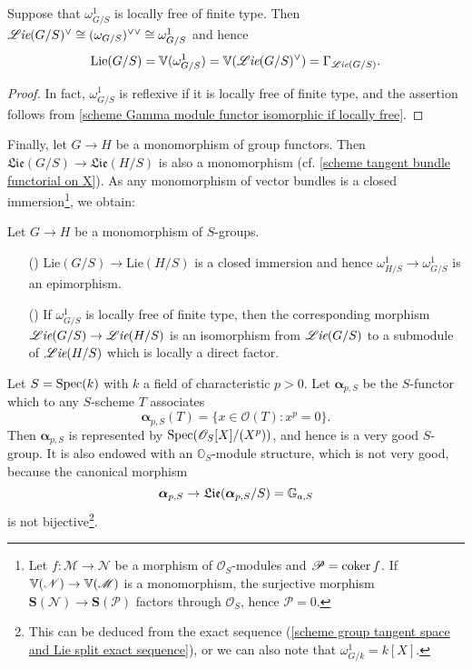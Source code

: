 \begin{proposition}\label{scheme group omega_G/S locally free construct Lie}
Suppose that $\omega_{G/S}^1$ is locally free of finite type. Then $\operatorname{\mathscr{L}\hspace*{-0.5pt}\textit{ie}}(G/S)^{\vee}\cong(\omega_{G/S})^{\vee\vee}\cong\omega_{G/S}^1$ and hence
\[\mathrm{Lie}(G/S)=\mathbb{V}(\omega_{G/S}^1)=\mathbb{V}(\operatorname{\mathscr{L}\hspace*{-0.5pt}\textit{ie}}(G/S)^{\vee})=\Gamma_{\operatorname{\mathscr{L}\hspace*{-0.5pt}\textit{ie}}(G/S)}.\]
\end{proposition}
\begin{proof}
In fact, $\omega_{G/S}^1$ is reflexive if it is locally free of finite type, and the assertion follows from \cref{scheme Gamma module functor isomorphic if locally free}.
\end{proof}

Finally, let $G\to H$ be a monomorphism of group functors. Then $\mathfrak{Lie}(G/S)\to\mathfrak{Lie}(H/S)$ is also a monomorphism (cf. \cref{scheme tangent bundle functorial on X}). As any monomorphism of vector bundles is a closed immersion\footnote{Let $f:\mathscr{M}\to\mathscr{N}$ be a morphism of $\mathscr{O}_S$-modules and $\mathscr{P}=\operatorname{coker} f$. If $\mathbb{V}(\mathscr{N})\to\mathbb{V}(\mathscr{M})$ is a monomorphism, the surjective morphism $\bm{S}(\mathscr{N})\to\bm{S}(\mathscr{P})$ factors through $\mathscr{O}_S$, hence $\mathscr{P}=0$.}, we obtain:

\begin{corollary}
Let $G\to H$ be a monomorphism of $S$-groups.
\begin{enumerate}
    \item[(\rmnum{1})] $\mathrm{Lie}(G/S)\to\mathrm{Lie}(H/S)$ is a closed immersion and hence $\omega_{H/S}^1\to\omega_{G/S}^1$ is an epimorphism.
    \item[(\rmnum{2})] If $\omega_{G/S}^1$ is locally free of finite type, then the corresponding morphism $\operatorname{\mathscr{L}\hspace*{-0.5pt}\textit{ie}}(G/S)\to\operatorname{\mathscr{L}\hspace*{-0.5pt}\textit{ie}}(H/S)$ is an isomorphism from $\operatorname{\mathscr{L}\hspace*{-0.5pt}\textit{ie}}(G/S)$ to a submodule of $\operatorname{\mathscr{L}\hspace*{-0.5pt}\textit{ie}}(H/S)$ which is locally a direct factor. 
\end{enumerate}
\end{corollary}

\begin{example}\label{scheme O_S-module alpha_p not good}
Let $S=\mathrm{Spec}(k)$ with $k$ a field of characteristic $p>0$. Let $\bm{\alpha}_{p,S}$ be the $S$-functor which to any $S$-scheme $T$ associates
\[\bm{\alpha}_{p,S}(T)=\{x\in\mathscr{O}(T):x^p=0\}.\]
Then $\bm{\alpha}_{p,S}$ is represented by $\mathrm{Spec}(\mathscr{O}_S[X]/(X^p))$, and hence is a very good $S$-group. It is also endowed with an $\mathbb{O}_S$-module structure, which is not very good, because the canonical morphism
\[\bm{\alpha}_{p,S}\to\mathfrak{Lie}(\bm{\alpha}_{p,S}/S)=\mathbb{G}_{a,S}\]
is not bijective\footnote{This can be deduced from the exact sequence (\ref{scheme group tangent space and Lie split exact sequence}), or we can also note that $\omega_{G/k}^1=k[X]$.}.
\end{example}

